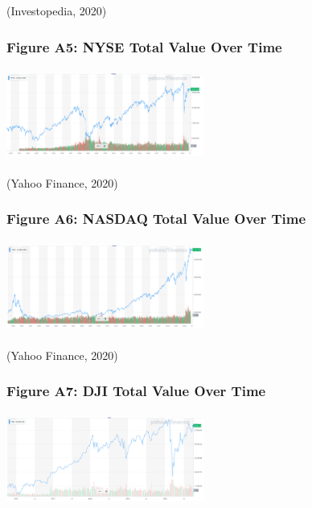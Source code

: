 \documentclass[11pt, english]{article}
\begin{document}
                        (Investopedia, 2020) 

		\subsubsection*{Figure A5: NYSE Total Value Over Time}  
                        
                        \begin{center}
                                \includegraphics[width=6.5cm,height=3cm]{A5.png}
                        \end{center}
                                                
                        (Yahoo Finance, 2020)

		\subsubsection*{Figure A6: NASDAQ Total Value Over Time}          
                        
                        \begin{center}
                                \includegraphics[width=6.5cm,height=3cm]{A6.png}
                        \end{center}
                                                
                        (Yahoo Finance, 2020)

		\subsubsection*{Figure A7: DJI Total Value Over Time} 
                        
                        \begin{center}
				\includegraphics[width=6.5cm,height=3cm]{A7.png}
                        \end{center}
                                                
\end{document}

